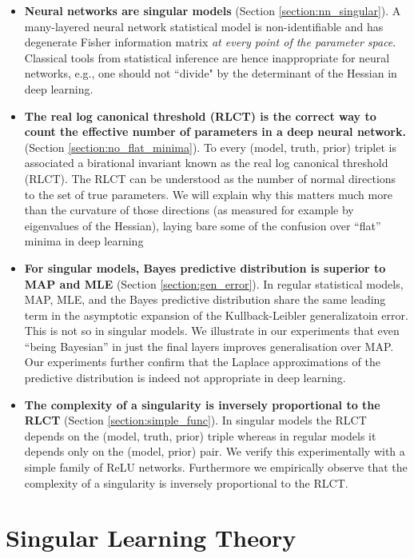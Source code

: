 \documentclass{article} %
\begin{document}
\begin{itemize}
    \item \textbf{Neural networks are singular models} (Section \ref{section:nn_singular}). A many-layered neural network statistical model is non-identifiable and has degenerate Fisher information matrix \emph{at every point of the parameter space}. Classical tools from statistical inference are hence inappropriate for neural networks, e.g., one should not ``divide" by the determinant of the Hessian in deep learning. 
    \item \textbf{The real log canonical threshold (RLCT) is the correct way to count the effective number of parameters in a deep neural network.} (Section \ref{section:no_flat_minima}). 
    To every (model, truth, prior) triplet is associated a birational invariant known as the real log canonical threshold (RLCT). The RLCT can be understood as the number of normal directions to the set of true parameters. We will explain why this matters much more than the curvature of those directions (as measured for example by eigenvalues of the Hessian), laying bare some of the confusion over ``flat'' minima in deep learning 
    \item \textbf{For singular models, Bayes predictive distribution is superior to MAP and MLE} (Section \ref{section:gen_error}). In regular statistical models, MAP, MLE, and the Bayes predictive distribution share the same leading term in the asymptotic expansion of the Kullback-Leibler generalizatoin error. This is not so in singular models. We illustrate in our experiments that even ``being Bayesian'' in just the final layers improves generalisation over MAP. Our experiments further confirm that the Laplace approximations of the predictive distribution is indeed not appropriate in deep learning.
    \item \textbf{The complexity of a singularity is inversely proportional to the RLCT} (Section \ref{section:simple_func}). In singular models the RLCT depends on the (model, truth, prior) triple whereas in regular models it depends only on the (model, prior) pair.
     We verify this experimentally with a simple family of ReLU networks. Furthermore we empirically observe that the complexity of a singularity is inversely proportional to the RLCT.
\end{itemize}

\section{Singular Learning Theory}
\end{document}
